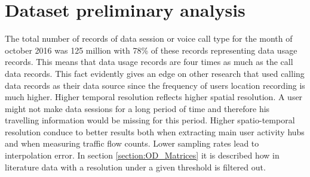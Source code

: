 \documentclass[12pt, a4paper]{report}
\theoremstyle{definition}
\theoremstyle{definition}%
\theoremstyle{definition}%
\theoremstyle{definition}%
\theoremstyle{definition}%
\theoremstyle{definition}%
\begin{document}
\begin{table}[h] 
    \centering
\caption{Description of data fields in the mobile usage raw dataset} 
\label{table:dataset_01}
\end{table}


\section{Dataset preliminary analysis} \label{section:methodology:data_set_preliminary_analysis}

The total number of records of data session or voice call type for the month of october 2016 was 125 million with 78\% of these records representing data usage records. This means that data usage records are four times as much as the call data records. This fact evidently gives an edge on other research that used calling data records as their data source since the frequency of users location recording is much higher. Higher temporal resolution reflects higher spatial resolution. A user might not make data sessions for a long period of time and therefore his travelling information would be missing for this period.  Higher spatio-temporal resolution conduce to better results both when extracting main user activity hubs and when measuring traffic flow counts. Lower sampling rates lead to interpolation error. In section \ref{section:OD_Matrices} it is described how in literature data with a resolution under a given threshold is filtered out.
\end{document}

